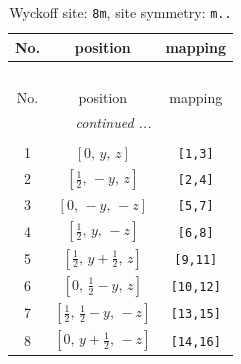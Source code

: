 \documentclass[fleqn,8pt]{jsarticle}
\begin{document}
\begin{longtable}{ccc}
\caption{Wyckoff site: {\tt 8m}, site symmetry: {\tt m..}}
 \\
 \hline \hline
No. & position & mapping \\ \hline \endfirsthead

\multicolumn{2}{l}{\tablename\ \thetable{}} \\
 \hline \hline
No. & position & mapping \\ \hline \endhead

 \hline \hline
\multicolumn{2}{r}{\footnotesize\it continued ...} \\ \endfoot

 \hline \hline
\multicolumn{2}{r}{} \\ \endlastfoot

1 & $\left[ 0,\, y,\, z \right]$ & {\tt [1,3]} \\ \hline
2 & $\left[ \frac{1}{2},\, - y,\, z \right]$ & {\tt [2,4]} \\ \hline
3 & $\left[ 0,\, - y,\, - z \right]$ & {\tt [5,7]} \\ \hline
4 & $\left[ \frac{1}{2},\, y,\, - z \right]$ & {\tt [6,8]} \\ \hline
5 & $\left[ \frac{1}{2},\, y + \frac{1}{2},\, z \right]$ & {\tt [9,11]} \\ \hline
6 & $\left[ 0,\, \frac{1}{2} - y,\, z \right]$ & {\tt [10,12]} \\ \hline
7 & $\left[ \frac{1}{2},\, \frac{1}{2} - y,\, - z \right]$ & {\tt [13,15]} \\ \hline
8 & $\left[ 0,\, y + \frac{1}{2},\, - z \right]$ & {\tt [14,16]} \\
\end{longtable}
\renewcommand{\arraystretch}{1.2}
\end{document}
